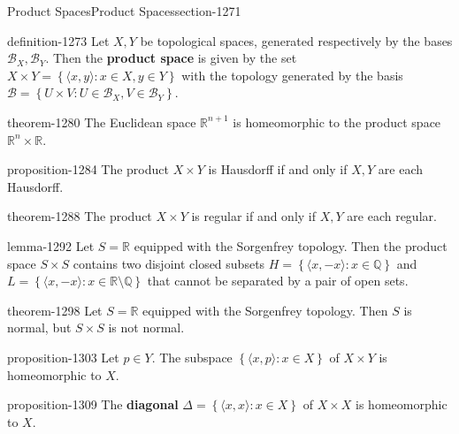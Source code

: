 \documentclass[oneside,10pt,]{article}
\newcommand{\terminology}[1]{\textbf{#1}}
\newcommand{\tuple}[1]{\langle #1 \rangle}
\newcommand{\mb}{\mathbb}
\newcommand{\mc}{\mathcal}
\newcommand{\setBuilder}[2]{\left\{#1:#2\right\}}
\begin{document}
%
%
\typeout{************************************************}
\typeout{************************************************}
%
\begin{sectionptx}{Product Spaces}{}{Product Spaces}{}{}{section-1271}
\begin{definition}{}{definition-1273}%
\hypertarget{p-1274}{}%
Let \(X,Y\) be topological spaces, generated respectively by the bases \(\mc B_X,\mc B_Y\). Then the \terminology{product space} is given by the set \(X\times Y=\setBuilder{\tuple{x,y}}{x\in X,y\in Y}\) with the topology generated by the basis \(\mc B=\setBuilder{U\times V}{U\in\mc B_X,V\in\mc B_Y}\).%
\end{definition}
\begin{theorem}{}{}{theorem-1280}%
\hypertarget{p-1281}{}%
The Euclidean space \(\mb R^{n+1}\) is homeomorphic to the product space \(\mb R^n\times\mb R\).%
\end{theorem}
\begin{proposition}{}{}{proposition-1284}%
\hypertarget{p-1285}{}%
The product \(X\times Y\) is Hausdorff if and only if \(X,Y\) are each Hausdorff.%
\end{proposition}
\begin{theorem}{}{}{theorem-1288}%
\hypertarget{p-1289}{}%
The product \(X\times Y\) is regular if and only if \(X,Y\) are each regular.%
\end{theorem}
\begin{lemma}{}{}{lemma-1292}%
\hypertarget{p-1293}{}%
Let \(S=\mb R\) equipped with the Sorgenfrey topology. Then the product space \(S\times S\) contains two disjoint closed subsets \(H=\setBuilder{\tuple{x,-x}}{x\in\mb Q}\) and \(L=\setBuilder{\tuple{x,-x}}{x\in\mb R\setminus\mb Q}\) that cannot be separated by a pair of open sets.%
\end{lemma}
\begin{theorem}{}{}{theorem-1298}%
\hypertarget{p-1299}{}%
Let \(S=\mb R\) equipped with the Sorgenfrey topology. Then \(S\) is normal, but \(S\times S\) is not normal.%
\end{theorem}
\begin{proposition}{}{}{proposition-1303}%
\hypertarget{p-1304}{}%
Let \(p\in Y\). The subspace \(\setBuilder{\tuple{x,p}}{x\in X}\) of \(X\times Y\) is homeomorphic to \(X\).%
\end{proposition}
\begin{proposition}{}{}{proposition-1309}%
\hypertarget{p-1310}{}%
The \terminology{diagonal} \(\Delta=\setBuilder{\tuple{x,x}}{x\in X}\) of \(X\times X\) is homeomorphic to \(X\).%

\end{proposition}
\end{sectionptx}
\end{document}
